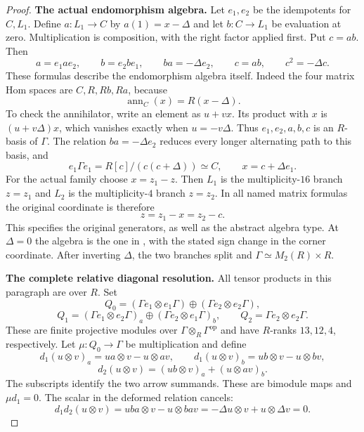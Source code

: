 \begin{proof}
\par\smallskip\noindent\textbf{The actual endomorphism algebra.}\quad
Let $e_1,e_2$ be the idempotents for $C,L_1$. Define
$a:L_1\to C$ by $a(1)=x-\Delta$ and let $b:C\to L_1$ be
evaluation at zero. Multiplication is composition, with the
right factor applied first. Put $c=ab$. Then
\begin{equation}\label{eq:relativearrows}
 a=e_1ae_2,\qquad b=e_2be_1,\qquad
 ba=-\Delta e_2,\qquad c=ab,\qquad c^2=-\Delta c.
\end{equation}
These formulas describe the endomorphism algebra itself.
Indeed the four matrix Hom spaces are $C,R,Rb,Ra$, because
\[
 \operatorname{ann}_C(x)=R(x-\Delta).
\]
To check the annihilator, write an element as $u+vx$.
Its product with $x$ is $(u+v\Delta)x$, which vanishes
exactly when $u=-v\Delta$. Thus $e_1,e_2,a,b,c$ is an
$R$-basis of $\Gamma$. The relation $ba=-\Delta e_2$
reduces every longer alternating path to this basis, and
\[
 e_1\Gamma e_1=R[c]/(c(c+\Delta))\simeq C,\qquad
 x=c+\Delta e_1.
\]
For the actual family choose $x=z_1-z$. Then $L_1$ is
the multiplicity-$16$ branch $z=z_1$ and $L_2$ is the
multiplicity-$4$ branch $z=z_2$. In all named matrix formulas
the original coordinate is therefore
\begin{equation}\label{eq:relativez}
 z=z_1-x=z_2-c.
\end{equation}
This specifies the original generators, as well as the abstract
algebra type. At $\Delta=0$ the algebra is the one in
, with the stated sign change in the corner coordinate.
After inverting $\Delta$, the two branches split and
$\Gamma\simeq M_2(R)\times R$.

\par\smallskip\noindent\textbf{The complete relative diagonal resolution.}\quad
All tensor products in this paragraph are over $R$. Set
\[
 Q_0=(\Gamma e_1\otimes e_1\Gamma)
        \oplus(\Gamma e_2\otimes e_2\Gamma),
\]
\[
 Q_1=(\Gamma e_1\otimes e_2\Gamma)_a
        \oplus(\Gamma e_2\otimes e_1\Gamma)_b,\qquad
 Q_2=\Gamma e_2\otimes e_2\Gamma.
\]
These are finite projective modules over
$\Gamma\otimes_R\Gamma^{\mathrm{op}}$ and have $R$-ranks
$13,12,4$, respectively. Let $\mu:Q_0\to\Gamma$ be
multiplication and define
\[
 d_1(u\otimes v)_a=ua\otimes v-u\otimes av,\qquad
 d_1(u\otimes v)_b=ub\otimes v-u\otimes bv,
\]
\[
 d_2(u\otimes v)=(ub\otimes v)_a+(u\otimes av)_b.
\]
The subscripts identify the two arrow summands. These are
bimodule maps and $\mu d_1=0$. The scalar in the deformed
relation cancels:
\[
 d_1d_2(u\otimes v)=uba\otimes v-u\otimes bav
     =-\Delta u\otimes v+u\otimes\Delta v=0.
\]


\end{proof}
